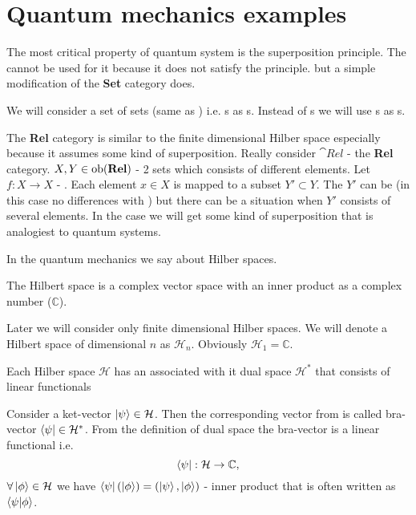 \section{Quantum mechanics examples}
The most critical property of quantum system is the superposition
principle. The  cannot be used for it
because it does not satisfy the principle. but a simple modification
of the \textbf{Set} category does. 
\begin{definition}
  \label{def:relcategory}
  We will consider a set of sets (same as )
  i.e. s as s. Instead of
  s we will use s as
  s. 

  The \textbf{Rel} category is similar to the finite dimensional
  Hilber space especially because it assumes some kind of superposition.
  Really consider $\cat{Rel}$ - the \textbf{Rel} category. $X, Y \in
  \mathrm{ob}(\mathbf{Rel})$ - 2 sets which consists of different elements. Let $f: X
  \to X$ - . Each element $x \in X$ is
  mapped to a subset $Y' \subset Y$. The $Y'$ can be
    (in this case no differences with
  ) but there can be a situation when $Y'$
  consists of several elements. In the case we will get some kind of
  superposition that is analogiest to quantum systems.
\end{definition}

In the quantum mechanics we say about Hilber spaces.
\begin{definition}
  \label{def:hilbert_space} The Hilbert space is a complex vector space
  with an inner product as a complex number ($\mathbb{C}$).

  Later we will consider only finite dimensional Hilber spaces.
  We will denote a Hilbert space of dimensional $n$ as
  $\mathcal{H}_n$. Obviously $\mathcal{H}_1 = \mathbb{C}$.
\end{definition}

\begin{definition}
\label{def:dual_space}
Each Hilber space $\mathcal{H}$ has an associated with it dual space
$\mathcal{H}^\ast$ that consists of linear functionals  
\end{definition}

\begin{example}
\label{ex:dirac_notation}
Consider a ket-vector $\ket{\psi} \in \mathcal{H}$. Then the
corresponding vector from  is called
bra-vector $\bra{\psi} \in \mathcal{H}^\ast$. From the definition of
dual space the bra-vector is a linear functional i.e. 
\[
\bra{\psi} : \mathcal{H} \to \mathbb{C},
\]
$\forall \ket{\phi} \in \mathcal{H}$ we have 
\(
\bra{\psi}\left(\ket{\phi}\right) = \left(\ket{\psi}, \ket{\phi}\right)
\) - inner product that is often written as $\bra{\psi}\ket{\phi}$.
\end{example}


